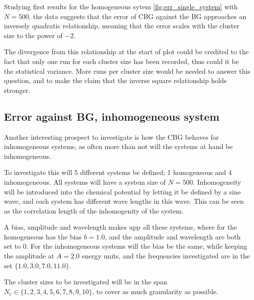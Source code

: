 \documentclass[11pt]{article}
\begin{document}

Studying first results for the homogeneous sytem \ref{fig:err_single_system} with $N=500$, the data suggests that the error of CBG against the BG approaches an inversely quadratic relationship, meaning that the error scales with the cluster size to the power of $-2$. 

The divergence from this relationship at the start of plot could be credited to the fact that only one run for each cluster size has been recorded, thus could it be the statistical variance. More runs per cluster size would be needed to answer this question, and to make the claim that the inverse square relationship holds stronger. 

\subsection{Error against BG, inhomogeneous system} %
\label{sub:error_against_nbm_inhom}

Another interesting prospect to investigate is how the CBG behaves for inhomogeneous systems, as often more than not will the systems at hand be inhomogeneous. 

To investigate this will 5 different systems be defined; 1 homogeneous and 4 inhomogeneous. All systems will have a system size of $N=500$. Inhomogeneity will be introduced into the chemical potential by letting it be defined by a sine wave, and each system has different wave lengths in this wave. This can be seen as the correlation length of the inhomogenity of the system.  

A bias, amplitude and wavelength makes upp all these systems, where for the homogeneous has the bias $b = 1.0$, and the amplitude and wavelength are both set to 0. For the inhomogeneous systems will the bias be the same, while keeping the amplitude at $A = 2.0$ energy units, and the frequencies investigated are in the set $\{ 1.0, 3.0, 7.0, 11.0 \}$. 

The cluster sizes to be investigated will be in the span $N_c \in \{1, 2, 3, 4, 5, 6, 7, 8, 9, 10\}$, to cover as much granularity as possible. 
\end{document}
